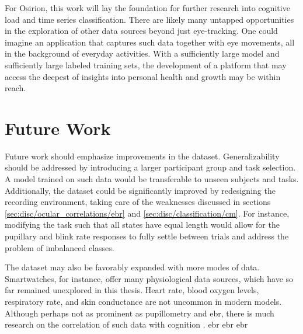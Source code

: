 For Osirion, this work will lay the foundation for further research into cognitive load and time series classification. There are likely many untapped opportunities in the exploration of other data sources beyond just eye-tracking. One could imagine an application that captures such data together with eye movements, all in the background of everyday activities. With a sufficiently large model and sufficiently large labeled training sets, the development of a platform that may access the deepest of insights into personal health and growth may be within reach. 



\section{Future Work}

Future work should emphasize improvements in the dataset. 
Generalizability sho\-uld be addressed by introducing a larger participant group and task selection. A model trained on such data would be transferable to unseen subjects and tasks. Additionally, the dataset could be significantly improved by redesigning the recording environment, taking care of the weaknesses discussed in sections \ref{sec:disc/ocular_correlations/ebr} and \ref{sec:disc/classification/cm}. For instance, modifying the task such that all states have equal length would allow for the pupillary and blink rate responses to fully settle between trials and address the problem of imbalanced classes.

The dataset may also be favorably expanded with more modes of data. Smartwatches, for instance, offer many physiological data sources, which have so far remained unexplored in this thesis. Heart rate, blood oxygen levels, respiratory rate, and skin conductance are not uncommon in modern models. Although perhaps not as prominent as pupillometry and \acrshort{ebr}, there is much research on the correlation of such data with cognition \cite{paas1994A, solhjoo2019, setz2010, ikehara2005, choi2014}.
\acrshort{ebr}
\acrlong{ebr}
\acrfull{ebr}




